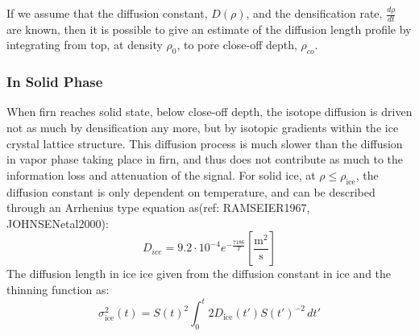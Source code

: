 \documentclass[../../CompleteThesis/Complete_1stDraft.tex]{subfiles}
\begin{document}
If we assume that the diffusion constant, $D(\rho)$, and the densification rate, $\frac{d\rho}{dt}$ are known, then it is possible to give an estimate of the diffusion length profile by integrating from top, at density $\rho_0$, to pore close-off depth, $\rho_{co}$.



\subsubsection{In Solid Phase}
\label{Subsubsec:Ice_DiffusionAndDensification_Diffusion_Ice}
When firn reaches solid state, below close-off depth, the isotope diffusion is driven not as much by densification any more, but by isotopic gradients within the ice crystal lattice structure. This diffusion process is much slower than the diffusion in vapor phase taking place in firn, and thus does not contribute as much to the information loss and attenuation of the signal. For solid ice, at $\rho \leq \rho_{\text{ice}}$, the diffusion constant is only dependent on temperature, and can be described through an Arrhenius type equation as(ref: RAMSEIER1967, JOHNSENetal2000):
\begin{equation}
	D_{ice} = 9.2 \cdot 10^{-4} e^{-\frac{7186}{T}} 	\left[\frac{\text{m}^2}{\text{s}}\right]
	\label{Eq:Ice_Diff_const}
\end{equation}
The diffusion length in ice ice given from the diffusion constant in ice and the thinning function as:
\begin{equation}
	\sigma^2_{\text{ice}}(t) = S(t)^2 \int_{0}^{t}2 D_{\text{ice}}(t') S(t')^{-2} \, dt'
	\label{Eq:Diff_Len_Ice}
\end{equation}
\end{document}

